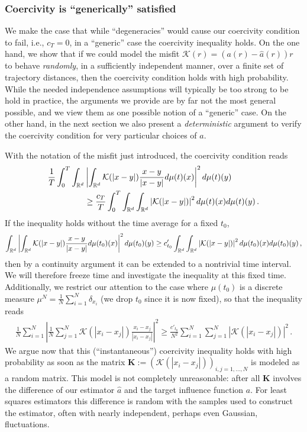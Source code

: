 \subsubsection{Coercivity is ``generically'' satisfied}\label{randomod}
We make the case that while ``degeneracies'' would cause our coercivity condition to fail, i.e., $c_T=0$, in a ``generic'' case the coercivity inequality holds.
On the one hand, we show that if we could model the misfit $\mathcal K(r)=(a(r)- \widehat a(r))r$ to behave {\it randomly}, in a sufficiently independent manner, over a finite set of trajectory distances, then
the coercivity condition holds with high probability. While the needed independence assumptions will typically be  too strong to be hold in practice, the arguments we provide are by far not the most general possible, and we view them as one possible notion of a ``generic'' case.
On the other hand, in the next section we also present a {\it deterministic} argument to verify the coercivity condition for very particular choices of $a$.

With the notation of the misfit just introduced, the coercivity condition reads
\begin{align*}
\frac1T\int_0^T\int_{\mathbb{R}^d}&\left|\int_{\mathbb{R}^d} \mathcal K(|x-y|)\frac{x-y}{|x-y|}d\mu(t)(x)\right|^2d\mu(t)(y) \\
&\ge\frac{c_T}{T}\int_0^T\int_{\mathbb{R}^d}\int_{\mathbb{R}^d}\left| \mathcal K(|x-y|)\right|^2d\mu(t)(x)d\mu(t)(y)\,.
\end{align*}
If the inequality holds without the time average for a fixed $t_0$,
\begin{align*}
\int_{\mathbb{R}^d}\left|\int_{\mathbb{R}^d} \mathcal K(|x-y|)\frac{x-y}{|x-y|}d\mu(t_0)(x)\right|^2d\mu(t_0)(y)
\ge c_{t_0}'\int_{\mathbb{R}^d}\int_{\mathbb{R}^d}\left| \mathcal K(|x-y|)\right|^2d\mu(t_0)(x)d\mu(t_0)(y)\,,
\end{align*}
then by a continuity argument it can be extended to a nontrivial time interval. We will therefore freeze time and investigate the inequality at this fixed time. 
Additionally, we restrict our attention to the case where $\mu(t_0)$ is a discrete measure $\mu^N=\frac1N\sum_{i=1}^N\delta_{x_i}$ (we drop $t_0$ since it is now fixed), so that the inequality reads
\begin{align}
\frac1N\sum_{i=1}^N\left|\frac{1}{N} \sum_{j=1}^N  \mathcal K(|x_i-x_j|)\frac{x_i-x_j}{|x_i-x_j|}\right|^2\ge \frac{c'_{t_0}}{N^2}\sum_{i=1}^N\sum_{j=1}^N\left| \mathcal K(|x_i-x_j|)\right|^2\,.
\label{e:coercivitydiscrete}
\end{align}
We argue now that this (``instantaneous'') coercivity inequality holds with high probability as soon as the matrix $\mathbf{K}:=(\mathcal K(|x_i-x_j|))_{i,j=1,\dots,N}$ is modeled as a random matrix.
This model is not completely unreasonable: after all $\mathbf K$ involves the difference of our estimator $\widehat a$ and the target influence function $a$. For least squares estimators this difference is random with the samples used to construct the estimator, often with nearly independent, perhaps even Gaussian, fluctuations. 


